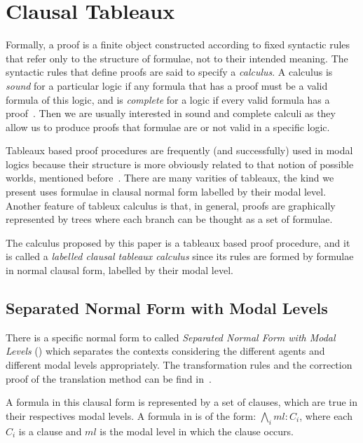 \section{Clausal Tableaux}
\label{sec:tableauxclausal}

Formally, a proof is a finite object constructed according to fixed syntactic
rules that refer only to the structure of formulae, not to their intended
meaning. The syntactic rules that define proofs are said to specify a
\emph{calculus}. A calculus is \emph{sound} for a particular logic if any
formula that has a proof must be a valid formula of this logic, and is
\emph{complete} for a logic if every valid formula has a proof~\cite{fitting}.
Then we are usually interested in sound and complete calculi as they allow us
to produce proofs that formulae are or not valid in a specific logic.

Tableaux based proof procedures are frequently (and successfully) used in modal
logics because their structure is more obviously related to that notion of
possible worlds, mentioned before~\cite{fitting}. There are many varities of
tableaux, the kind we present uses formulae in clausal normal form labelled by
their modal level. Another feature of tableux calculus is that, in general,
proofs are graphically represented by trees where each branch can be thought as
a set of formulae.

The calculus proposed by this paper is a tableaux based proof procedure, and it
is called a \emph{labelled clausal tableaux calculus} since its rules are formed
by formulae in normal clausal form, labelled by their modal level.

\subsection{Separated Normal Form with Modal Levels}
\label{sec:snf}

There is a specific normal form to  called \emph{Separated Normal
Form with Modal Levels} () which separates the contexts considering the
different agents and different modal levels appropriately. The transformation
rules and the correction proof of the translation method can be find
in~\cite{nalon2015modal}.

A formula in this clausal form is represented by a set of clauses, which are
true in their respectives modal levels. A formula in  is of the form:
$\bigwedge_i ml : C_i$,
where each $C_i$ is a clause and $ml$ is the modal level in which the clause
occurs.

